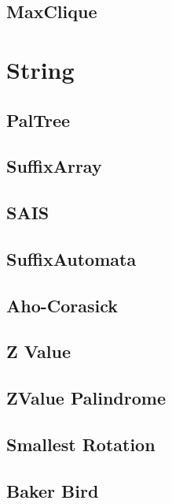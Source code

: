 \documentclass[10pt,twocolumn,oneside]{article}
\begin{document}
\subsection{MaxClique}


\section{String}
\subsection{PalTree}


\subsection{SuffixArray}


\subsection{SAIS}


\subsection{SuffixAutomata}


\subsection{Aho-Corasick}


\subsection{Z Value}


\subsection{ZValue Palindrome}


\subsection{Smallest Rotation}


\subsection{Baker Bird}

\end{document}
